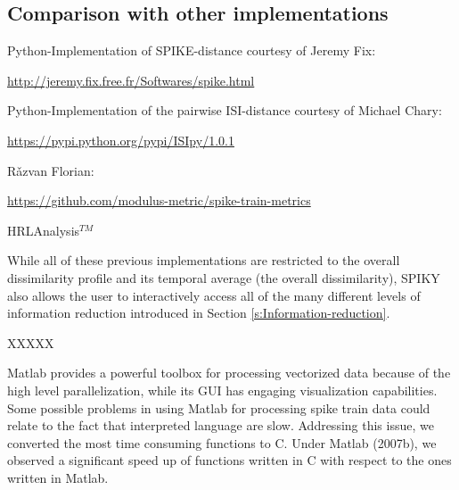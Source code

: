 \documentclass[10pt,twocolumn]{elsart5p}
\begin{document}
%


\subsection{\label{ss:Comparison} Comparison with other implementations}

Python-Implementation of SPIKE-distance courtesy of Jeremy Fix:

\url{http://jeremy.fix.free.fr/Softwares/spike.html}

Python-Implementation of the pairwise ISI-distance courtesy of Michael Chary:

\url{https://pypi.python.org/pypi/ISIpy/1.0.1}

R{\v a}zvan Florian:

\url{https://github.com/modulus-metric/spike-train-metrics}

\citep{Rusu14}

HRLAnalysis$^{TM}$ \citep{Thibeault14}

While all of these previous implementations are restricted to the overall dissimilarity profile and its temporal average (the overall dissimilarity), SPIKY also allows the user to interactively access all of the many different levels of information reduction introduced in Section \ref{s:Information-reduction}.

XXXXX




Matlab provides a powerful toolbox for processing vectorized data because of the high level parallelization, while its GUI has engaging visualization capabilities. Some possible problems in using Matlab for processing spike train data could relate to the fact that interpreted language are slow. Addressing this issue, we converted the most time consuming functions to C. Under Matlab (2007b), we observed a significant speed up of functions written in C  with respect to the ones written in Matlab. 
\end{document}
